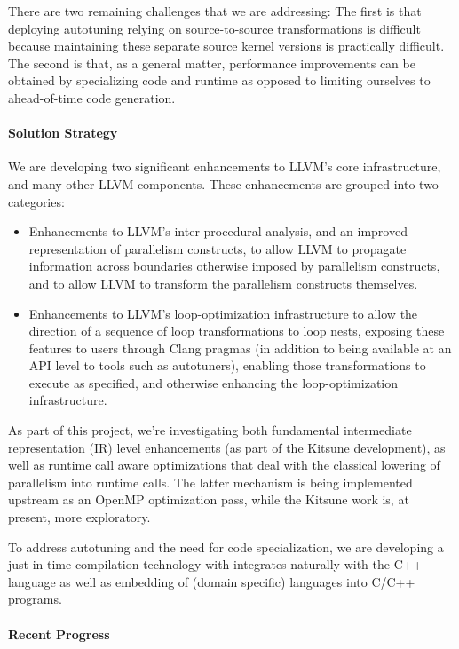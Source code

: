 There are two remaining challenges that we are addressing: The first is that deploying autotuning relying on source-to-source transformations is difficult because maintaining these separate source kernel versions is practically difficult. The second is that, as a general matter, performance improvements can be obtained by specializing code and runtime as opposed to limiting ourselves to ahead-of-time code generation.

\paragraph{Solution Strategy}
We are developing two significant enhancements to LLVM's core infrastructure, and many other LLVM components. These enhancements are grouped into two categories:
\begin{itemize}
\item Enhancements to LLVM's inter-procedural analysis, and an improved representation of parallelism constructs, to allow LLVM to propagate information across boundaries otherwise imposed by parallelism constructs, and to allow LLVM to transform the parallelism constructs themselves.
\item Enhancements to LLVM's loop-optimization infrastructure to allow the direction of a sequence of loop transformations to loop nests, exposing these features to users through Clang pragmas (in addition to being available at an API level to tools such as autotuners), enabling those transformations to execute as specified, and otherwise enhancing the loop-optimization infrastructure.
\end{itemize}

As part of this project, we're investigating both fundamental intermediate
representation (IR) level enhancements (as part of the Kitsune development), as
well as runtime call aware optimizations that deal with the classical lowering
of parallelism into runtime calls. The latter mechanism is being implemented
upstream as an OpenMP optimization pass, while the Kitsune work is, at present,
more exploratory.

To address autotuning and the need for code specialization, we are developing a just-in-time compilation technology with integrates naturally with the C++ language as well as embedding of (domain specific) languages into C/C++ programs.

\paragraph{Recent Progress}

